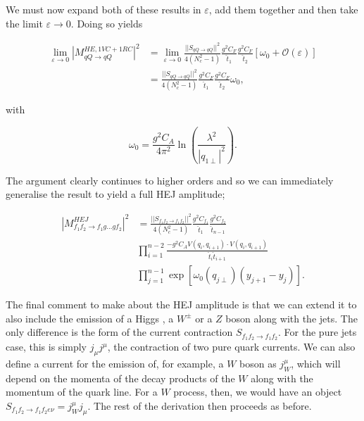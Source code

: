 We must now expand both of these results in $\varepsilon$, add them together and then take the limit $\varepsilon \to 0$. Doing so yields

\begin{equation}
\begin{split}
\lim_{\varepsilon \to 0} |M_{qQ \to qQ}^{HE, 1VC+1RC}|^2 &= \lim_{\varepsilon \to 0} \frac{||S_{qQ \to qQ}||^2}{4 (N_c^2 - 1)}\frac{g^2 C_{F}}{\hat{t}_1} \frac{g^2 C_{F}}{\hat{t}_2} \left[\omega_0 + \mathcal{O}(\varepsilon) \right] \\
&= \frac{||S_{qQ \to qQ}||^2}{4 (N_c^2 - 1)}\frac{g^2 C_{F}}{\hat{t}_1} \frac{g^2 C_{F}}{\hat{t}_2} \omega_0,
\end{split}
\end{equation}

with

\begin{equation}
\omega_0 = \frac{g^2 C_A}{4 \pi^2} \ln \left( \frac{\lambda^2}{|q_{1 \perp}|^2}\right).
\end{equation}

The argument clearly continues to higher orders and so we can immediately generalise the result to yield a full HEJ amplitude; %

\begin{equation}
\begin{split}
|M_{f_1f_2 \to f_1g...gf_2}^{HEJ}|^2 &= \frac{||S_{f_1 f_2 \to f_1 f_2}||^2}{4 (N_c^2 - 1)}\frac{g^2 C_{f_1}}{\hat{t}_1} \frac{g^2 C_{f_2}}{\hat{t}_{n-1}} \\
& \prod_{i=1}^{n-2} \frac{-g^2 C_A V(q_{i}, q_{i+1}) \cdot V(q_{i}, q_{i+1})}{\hat{t}_{i} \hat{t}_{i+1}}  \\
& \prod_{j =1}^{n-1} \exp \left[ \omega_0(q_{j \perp})(y_{j+1} - y_j) \right].
\end{split}
\end{equation}

The final comment to make about the HEJ amplitude is that we can extend it to also include the emission of a Higgs \cite{Andersen2011a}, a $W^{\pm}$ \cite{Andersen2012} or a $Z$ boson \cite{Andersen2016} along with the jets. The only difference is the form of the current contraction $S_{f_1f_2 \to f_1 f_2}$. For the pure jets case, this is simply $j_\mu j^\mu$, the contraction of two pure quark currents. We can also define a current for the emission of, for example, a $W$ boson as $j^\mu_W$, which will depend on the momenta of the decay products of the $W$ along with the momentum of the quark line. For a $W$ process, then, we would have an object $S_{f_1 f_2 \to f_1 f_2 e \nu} = j^\mu_W j_\mu$. The rest of the derivation then proceeds as before. 

